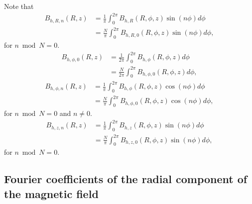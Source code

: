 \documentclass{article}
\begin{document}
Note that
\[\begin{aligned}
B_{h, R, n}(R, z)&=\frac{1}{\pi}\int_{0}^{2\pi}B_{h, R}(R, \phi, z)\sin(n\phi)d\phi \\
&= \frac{N}{\pi}\int_0^{2\pi} B_{h, R, 0}(R, \phi, z)\sin(n\phi)d\phi,
\end{aligned}\]
for $n \bmod N = 0$.
\[\begin{aligned}
B_{h, \phi, 0}(R, z)&=\frac{1}{2\pi}\int_{0}^{2\pi}B_{h, \phi}(R, \phi, z)d\phi \\
&= \frac{N}{2\pi}\int_0^{2\pi} B_{h, \phi, 0}(R, \phi, z)d\phi,
\end{aligned}\]
\[\begin{aligned}
B_{h, \phi, n}(R, z)&=\frac{1}{\pi}\int_{0}^{2\pi}B_{h, \phi}(R, \phi, z)\cos(n\phi)d\phi \\
&= \frac{N}{\pi}\int_0^{2\pi} B_{h, \phi, 0}(R, \phi, z)\cos(n\phi)d\phi,
\end{aligned}\]
for $n \bmod N = 0$ and $n\ne0$.
\[\begin{aligned}
B_{h, z, n}(R, z)&=\frac{1}{\pi}\int_{0}^{2\pi}B_{h, z}(R, \phi, z)\sin(n\phi)d\phi \\
&= \frac{N}{\pi}\int_0^{2\pi} B_{h, z, 0}(R, \phi, z)\sin(n\phi)d\phi,
\end{aligned}\]
for $n \bmod N = 0$.

\subsection{Fourier coefficients of the radial component of the magnetic field}
\end{document}
